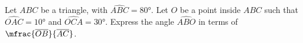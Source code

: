 Let $ABC$ be a triangle, with $\widehat{ABC} = \ang{80}$.
Let $O$ be a point inside $ABC$
such that $\widehat{OAC} = \ang{10}$
and $\widehat{OCA} = \ang{30}$. \newline
Express the angle $\widehat{ABO}$ in terms of $\mfrac{\overline{OB}}{\overline{AC}}$.
